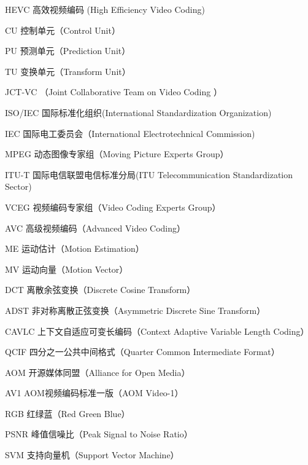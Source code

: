 \begin{denotation}[3cm]
\item[HEVC] 高效视频编码 (High Efficiency Video Coding)
\item[CU] 控制单元（Control Unit）
\item[PU] 预测单元（Prediction Unit）
\item[TU] 变换单元（Transform Unit）
\item[JCT-VC] （Joint Collaborative Team on Video Coding ）
\item[ISO/IEC] 国际标准化组织(International Standardization Organization)
\item[IEC] 国际电工委员会（International Electrotechnical Commission)
\item[MPEG] 动态图像专家组（Moving Picture Experts Group）
\item[ITU-T] 国际电信联盟电信标准分局(ITU Telecommunication Standardization Sector)
\item[VCEG] 视频编码专家组（Video Coding Experts Group）
\item[AVC] 高级视频编码（Advanced Video Coding）
\item[ME] 运动估计（Motion Estimation）
\item[MV] 运动向量（Motion Vector）
\item[DCT] 离散余弦变换（Discrete Cosine Transform）
\item[ADST] 非对称离散正弦变换（Asymmetric Discrete Sine Transform）
\item[CAVLC] 上下文自适应可变长编码（Context Adaptive Variable Length Coding）
\item[QCIF] 四分之一公共中间格式（Quarter Common Intermediate Format）
\item[AOM] 开源媒体同盟（Alliance for Open Media）
\item[AV1] AOM视频编码标准一版（AOM Video-1）
\item[RGB] 红绿蓝（Red Green Blue）
\item[PSNR] 峰值信噪比（Peak Signal to Noise Ratio）
\item[SVM] 支持向量机（Support Vector Machine）
\end{denotation}
